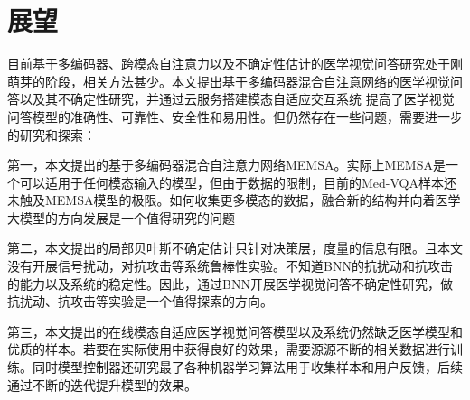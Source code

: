 \section*{展望}
目前基于多编码器、跨模态自注意力以及不确定性估计的医学视觉问答研究处于刚萌芽的阶段，相关方法甚少。本文提出基于多编码器混合自注意网络的医学视觉问答以及其不确定性研究，并通过云服务搭建模态自适应交互系统
提高了医学视觉问答模型的准确性、可靠性、安全性和易用性。但仍然存在一些问题，需要进一步的研究和探索：

第一，本文提出的基于多编码器混合自注意力网络MEMSA。实际上MEMSA是一个可以适用于任何模态输入的模型，但由于数据的限制，目前的Med-VQA样本还未触及MEMSA模型的极限。如何收集更多模态的数据，融合新的结构并向着医学大模型的方向发展是一个值得研究的问题

第二，本文提出的局部贝叶斯不确定估计只针对决策层，度量的信息有限。且本文没有开展信号扰动，对抗攻击等系统鲁棒性实验。不知道BNN的抗扰动和抗攻击的能力以及系统的稳定性。因此，通过BNN开展医学视觉问答不确定性研究，做抗扰动、抗攻击等实验是一个值得探索的方向。

第三，本文提出的在线模态自适应医学视觉问答模型以及系统仍然缺乏医学模型和优质的样本。若要在实际使用中获得良好的效果，需要源源不断的相关数据进行训练。同时模型控制器还研究最了各种机器学习算法用于收集样本和用户反馈，后续通过不断的迭代提升模型的效果。